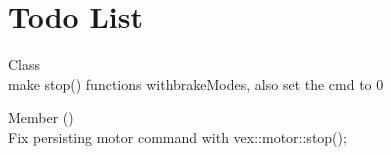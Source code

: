 \chapter{Todo List}
\hypertarget{todo}{}\label{todo}

\begin{DoxyRefList}
\item[Class \doxylink{classart_1_1_simple_motor}{art\+::Simple\+Motor} ]\hfill \\
\label{todo__todo000001}%
%
make stop() functions withbrake\+Modes, also set the cmd to 0  
\item[Member \doxylink{classart_1_1_simple_motor_aa3d8f01a6a434cdb8d6559dfe7b8d642}{art\+::Simple\+Motor\+::get} ()]\hfill \\
\label{todo__todo000002}%
%
Fix persisting motor command with vex\+::motor\+::stop();
\end{DoxyRefList}
